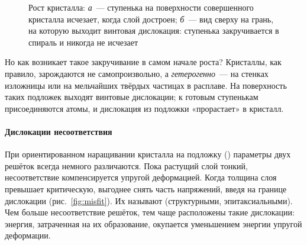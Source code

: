 \begin{figure}[ht]
\centering
\begin{subfigure}[b]{0.42\textwidth}\centering
{}
\caption{}
\end{subfigure}\hfill
\begin{subfigure}[b]{0.42\textwidth}\centering
{}
\caption{}
\end{subfigure}
\caption{Рост кристалла: \textit{а}~— ступенька на поверхности
совершенного кристалла исчезает, когда слой достроен; \textit{б}~— вид
сверху на грань, на которую выходит винтовая дислокация: ступенька
закручивается в спираль и никогда не исчезает}
\label{fig:growth}
\end{figure}

Но как возникает такое закручивание в самом начале роста? Кристаллы,
как правило, зарождаются не самопроизвольно, а \emph{гетерогенно}~— на
стенках изложницы или на мельчайших твёрдых частицах в расплаве. На
поверхность таких подложек выходят винтовые дислокации; к готовым
ступенькам присоединяются атомы, и дислокация из подложки «прорастает»
в кристалл.

\paragraph{Дислокации несоответствия}
При ориентированном наращивании кристалла на подложку ()
параметры двух решёток всегда немного различаются. Пока растущий слой
тонкий, несоответствие компенсируется упругой деформацией. Когда толщина
слоя превышает критическую, выгоднее снять часть напряжений, введя на
границе дислокации (рис.~\ref{fig:misfit}). Их называют
 (структурными, эпитаксиальными). Чем
больше несоответствие решёток, тем чаще расположены такие дислокации:
энергия, затраченная на их образование, окупается уменьшением энергии
упругой деформации.

